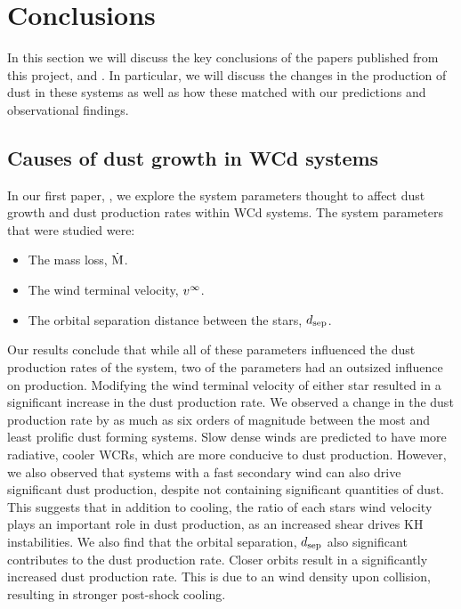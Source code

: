 \section{Conclusions}

In this section we will discuss the key conclusions of the papers published from this project, \emph{\firstpapertitle{}} and \emph{\secondpapertitle}.
In particular, we will discuss the changes in the production of dust in these systems as well as how these matched with our predictions and observational findings.

\subsection{Causes of dust growth in WCd systems}

In our first paper, \emph{\firstpapertitle}, we explore the system parameters thought to affect dust growth and dust production rates within WCd systems.
The system parameters that were studied were:

\begin{itemize}
  \item The mass loss, $\dot{\text{M}}$.
  \item The wind terminal velocity, $v^\infty$.
  \item The orbital separation distance between the stars, $d_\text{sep}$.
\end{itemize}

\noindent
Our results conclude that while all of these parameters influenced the dust production rates of the system, two of the parameters had an outsized influence on production.
Modifying the wind terminal velocity of either star resulted in a significant increase in the dust production rate.
We observed a change in the dust production rate by as much as six orders of magnitude between the most and least prolific dust forming systems.
Slow dense winds are predicted to have more radiative, cooler WCRs, which are more conducive to dust production.
However, we also observed that systems with a fast secondary wind can also drive significant dust production, despite not containing significant quantities of dust.
This suggests that in addition to cooling, the ratio of each stars wind velocity plays an important role in dust production, as an increased shear drives KH instabilities.
We also find that the orbital separation, $d_\text{sep}$ also significant contributes to the dust production rate.
Closer orbits result in a significantly increased dust production rate.
This is due to an wind density upon collision, resulting in stronger post-shock cooling.

